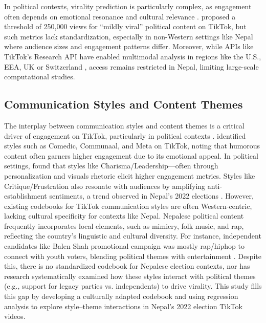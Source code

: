 \documentclass[12pt,a4paper]{report}
\begin{document}
In political contexts, virality prediction is particularly complex, as engagement often depends on emotional resonance and cultural relevance \parencite{berger2012viral}. \parencite{ingelstam2023populism} proposed a threshold of 250,000 views for “mildly viral” political content on TikTok, but such metrics lack standardization, especially in non-Western settings like Nepal where audience sizes and engagement patterns differ. Moreover, while APIs like TikTok’s Research API have enabled multimodal analysis in regions like the U.S., EEA, UK or Switzerland \parencite{tiktokResearchAPI2025}, access remains restricted in Nepal, limiting large-scale computational studies. 

\subsection{Communication Styles and Content Themes}

The interplay between communication styles and content themes is a critical driver of engagement on TikTok, particularly in political contexts \parencite{umansky2023dances}. \parencite{schellewald2021communicative} identified styles such as Comedic, Communaal, and Meta on TikTok, noting that humorous content often garners higher engagement due to its emotional appeal. In political settings, \parencite{cseri2024masterarbeit} found that styles like Charisma/Leadership—often through personalization and visuals rhetoric elicit higher engagement metrics. Styles like Critique/Frustration also resonate with audiences by amplifying anti-establishment sentiments, a trend observed in Nepal’s 2022 elections \parencite{dahal2023influence}.
\newpage
However, existing codebooks for TikTok communication styles \parencite{umansky2023dances} are often Western-centric, lacking cultural specificity for contexts like Nepal. Nepalese political content frequently incorporates local elements, such as mimicry, folk music, and rap, reflecting the country’s linguistic and cultural diversity. For instance, independent candidates like Balen Shah promotional campaign was mostly rap/hiphop to connect with youth voters, blending political themes with entertainment \parencite{menge2022kathmandu}. Despite this, there is no standardized codebook for Nepalese election contexts, nor has research systematically examined how these styles interact with political themes (e.g., support for legacy parties vs. independents) to drive virality. This study fills this gap by developing a culturally adapted codebook and using regression analysis to explore style–theme interactions in Nepal’s 2022 election TikTok videos.
\end{document}
